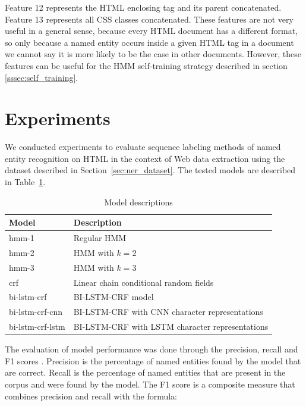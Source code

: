 \documentclass{nle}
\begin{document}
Feature 12 represents the HTML enclosing tag and its parent concatenated. Feature 13
represents all CSS classes concatenated. These features are not very useful in a general
sense, because every HTML document has a different format, so only because a named entity
occurs inside a given HTML tag in a document we cannot say it is more likely to be the case 
in other documents. However, these features can be useful for the HMM self-training strategy 
described in section \ref{sssec:self_training}. 

\section{Experiments}

We conducted experiments to evaluate sequence labeling methods of named entity 
recognition on HTML in the context of Web data extraction using the dataset 
described in Section~\ref{sec:ner_dataset}. The tested models are described in
Table~\ref{tab:models}.

\begin{table}[h]
  \small
  \begin{center}
    \begin{tabular}{ ll }
      \toprule
      Model & Description \\
      \midrule
      hmm-1            & Regular HMM \\
      hmm-2            & HMM with $ k=2 $ \\
      hmm-3            & HMM with $ k=3 $ \\
      crf              & Linear chain conditional random fields \\
      bi-lstm-crf      & BI-LSTM-CRF model \cite{Huang2015} \\
      bi-lstm-crf-cnn  & BI-LSTM-CRF with CNN character representations \cite{Ma2016} \\
      bi-lstm-crf-lstm & BI-LSTM-CRF with LSTM character representations \cite{Lample2016} \\
      \bottomrule
    \end{tabular}
  \end{center}
  \caption{Model descriptions}
  \label{tab:models}
\end{table}

The evaluation of model performance was done through the precision, recall and 
F1 scores \cite{Rijsbergen1979}. Precision is the percentage of named entities found by 
the model that are correct. Recall is the percentage of named entities that are present
in the corpus and were found by the model. The F1 score is a composite measure that combines
precision and recall with the formula:
\end{document}
